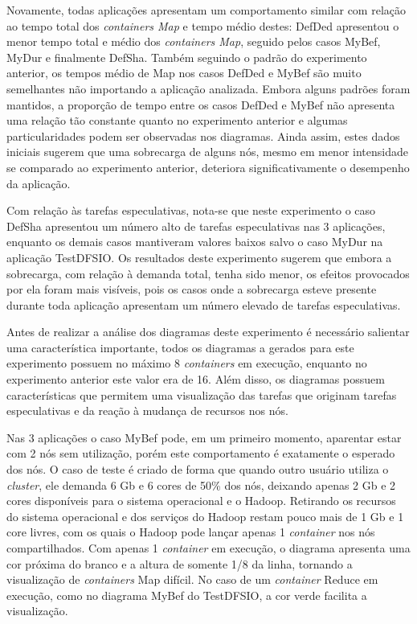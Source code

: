 Novamente, todas aplicações apresentam um comportamento similar com relação ao tempo total dos \textit{containers Map} e tempo médio destes: DefDed apresentou o menor tempo total e médio dos \textit{containers Map}, seguido pelos casos MyBef, MyDur e finalmente DefSha. Também seguindo o padrão do experimento anterior, os tempos médio de Map nos casos DefDed e MyBef são muito semelhantes não importando a aplicação analizada. Embora alguns padrões foram mantidos, a proporção de tempo entre os casos DefDed e MyBef não apresenta uma relação tão constante quanto no experimento anterior e algumas particularidades podem ser observadas nos diagramas. Ainda assim, estes dados iniciais sugerem que uma sobrecarga de alguns nós, mesmo em menor intensidade se comparado ao experimento anterior, deteriora significativamente o desempenho da aplicação.

Com relação às tarefas especulativas, nota-se que neste experimento o caso DefSha apresentou um número alto de tarefas especulativas nas 3 aplicações, enquanto os demais casos mantiveram valores baixos salvo o caso MyDur na aplicação TestDFSIO. Os resultados deste experimento sugerem que embora a sobrecarga, com relação à demanda total, tenha sido menor, os efeitos provocados por ela foram mais visíveis, pois os casos onde a sobrecarga esteve presente durante toda aplicação apresentam um número elevado de tarefas especulativas.

Antes de realizar a análise dos diagramas deste experimento é necessário salientar uma característica importante, todos os diagramas a gerados para este experimento possuem no máximo 8 \textit{containers} em execução, enquanto no experimento anterior este valor era de 16. Além disso, os diagramas possuem características que permitem uma visualização das tarefas que originam tarefas especulativas e da reação à mudança de recursos nos nós. 

Nas 3 aplicações o caso MyBef pode, em um primeiro momento, aparentar estar com 2 nós sem utilização, porém este comportamento é exatamente o esperado dos nós. O caso de teste é criado de forma que quando outro usuário utiliza o \textit{cluster}, ele demanda 6 Gb e 6 cores de 50\% dos nós, deixando apenas 2 Gb e 2 cores disponíveis para o sistema operacional e o Hadoop. Retirando os recursos do sistema operacional e dos serviços do Hadoop restam pouco mais de 1 Gb e 1 core livres, com os quais o Hadoop pode lançar apenas 1 \textit{container} nos nós compartilhados. Com apenas 1 \textit{container} em execução, o diagrama apresenta uma cor próxima do branco e a altura de somente 1/8 da linha, tornando a visualização de \textit{containers} Map difícil. No caso de um \textit{container} Reduce em execução, como no diagrama MyBef do TestDFSIO, a cor verde facilita a visualização.


